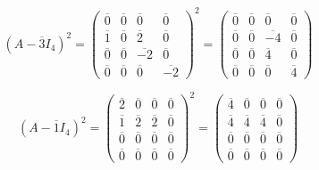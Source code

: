\documentclass[a4paper,12pt]{article}
\begin{document}
\[
(A - \overline{3}I_4)^2 = \begin{pmatrix}
  \overline{0} & \overline{0} & \overline{0}  & \overline{0} \\
  \overline{1} & \overline{0} & \overline{2}  & \overline{0} \\
  \overline{0} & \overline{0} & \overline{-2} & \overline{0} \\
  \overline{0} & \overline{0} & \overline{0}  & \overline{-2}
\end{pmatrix}^{\!2}
= \begin{pmatrix}
  \overline{0} & \overline{0} & \overline{0}  & \overline{0} \\
  \overline{0} & \overline{0} & \overline{-4} & \overline{0} \\
  \overline{0} & \overline{0} & \overline{4}  & \overline{0} \\
  \overline{0} & \overline{0} & \overline{0}  & \overline{4}
\end{pmatrix}
\]

\[
(A - \overline{1}I_4)^2 = \begin{pmatrix}
  \overline{2} & \overline{0} & \overline{0} & \overline{0} \\
  \overline{1} & \overline{2} & \overline{2} & \overline{0} \\
  \overline{0} & \overline{0} & \overline{0} & \overline{0} \\
  \overline{0} & \overline{0} & \overline{0} & \overline{0}
\end{pmatrix}^{\!2}
= \begin{pmatrix}
  \overline{4} & \overline{0} & \overline{0} & \overline{0} \\
  \overline{4} & \overline{4} & \overline{4} & \overline{0} \\
  \overline{0} & \overline{0} & \overline{0} & \overline{0} \\
  \overline{0} & \overline{0} & \overline{0} & \overline{0}
\end{pmatrix}
\]
\end{document}

